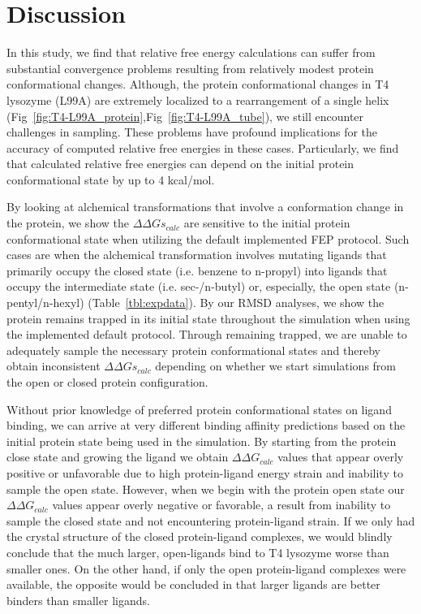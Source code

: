 \documentclass[journal=jctcce,manuscript=article]{achemso}
\begin{document}
\section{Discussion}
In this study, we find that relative free energy calculations can suffer from substantial convergence problems resulting from relatively modest protein conformational changes.
Although, the protein conformational changes in T4 lysozyme (L99A) are extremely localized to a rearrangement of a single helix (Fig~\ref{fig:T4-L99A_protein},Fig~\ref{fig:T4-L99A_tube}), we still encounter challenges in sampling.
These problems have profound implications for the accuracy of computed relative free energies in these cases.
Particularly, we find that calculated relative free energies can depend on the initial protein conformational state by up to 4 kcal/mol.

By looking at alchemical transformations that involve a conformation change in the protein, we show the $\Delta\Delta Gs_{calc}$ are sensitive to the initial protein conformational state when utilizing the default implemented FEP protocol.
Such cases are when the alchemical transformation involves mutating ligands that primarily occupy the closed state (i.e. benzene to n-propyl) into ligands that occupy the intermediate state (i.e. sec-/n-butyl) or, especially, the open state (n-pentyl/n-hexyl) (Table~\ref{tbl:expdata}).
By our RMSD analyses, we show the protein remains trapped in its initial state throughout the simulation when using the implemented default protocol.
Through remaining trapped, we are unable to adequately sample the necessary protein conformational states and thereby obtain inconsistent $\Delta\Delta Gs_{calc}$ depending on whether we start simulations from the open or closed protein configuration.


Without prior knowledge of preferred protein conformational states on ligand binding, we can arrive at very different binding affinity predictions based on the initial protein state being used in the simulation.
By starting from the protein close state and growing the ligand we obtain $\Delta\Delta G_{calc}$ values that appear overly positive or unfavorable due to high protein-ligand energy strain and inability to sample the open state. 
However, when we begin with the protein open state our $\Delta\Delta G_{calc}$ values appear overly negative or favorable, a result from inability to sample the closed state and not encountering protein-ligand strain.
If we only had the crystal structure of the closed protein-ligand complexes, we would blindly conclude that the much larger, open-ligands bind to T4 lysozyme worse than smaller ones.
On the other hand, if only the open protein-ligand complexes were available, the opposite would be concluded in that larger ligands are better binders than smaller ligands.
\end{document}
